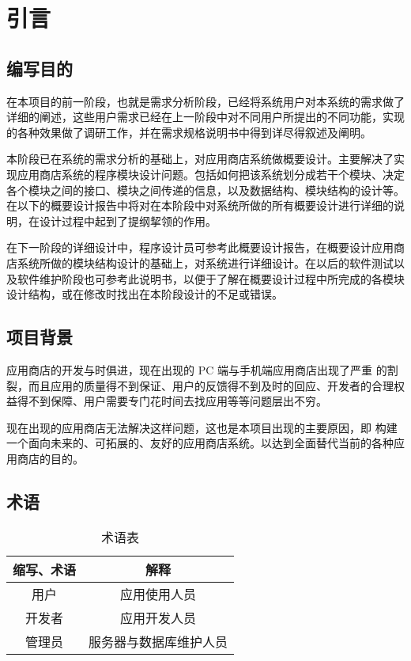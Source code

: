 \chapter{引言}
\section{编写目的}
在本项目的前一阶段，也就是需求分析阶段，已经将系统用户对本系统的需求做了详细的阐述，这些用户需求已经在上一阶段中对不同用户所提出的不同功能，实现的各种效果做了调研工作，并在需求规格说明书中得到详尽得叙述及阐明。

本阶段已在系统的需求分析的基础上，对应用商店系统做概要设计。主要解决了实现应用商店系统的程序模块设计问题。包括如何把该系统划分成若干个模块、决定各个模块之间的接口、模块之间传递的信息，以及数据结构、模块结构的设计等。在以下的概要设计报告中将对在本阶段中对系统所做的所有概要设计进行详细的说明，在设计过程中起到了提纲挈领的作用。

在下一阶段的详细设计中，程序设计员可参考此概要设计报告，在概要设计应用商店系统所做的模块结构设计的基础上，对系统进行详细设计。在以后的软件测试以及软件维护阶段也可参考此说明书，以便于了解在概要设计过程中所完成的各模块设计结构，或在修改时找出在本阶段设计的不足或错误。


\section{项目背景}
应用商店的开发与时俱进，现在出现的 PC 端与手机端应用商店出现了严重
的割裂，而且应用的质量得不到保证、用户的反馈得不到及时的回应、开发者的合理权益得不到保障、用户需要专门花时间去找应用等等问题层出不穷。

现在出现的应用商店无法解决这样问题，这也是本项目出现的主要原因，即
构建一个面向未来的、可拓展的、友好的应用商店系统。以达到全面替代当前的各种应用商店的目的。

\section{术语}
\begin{table}[htbp]
\centering
\caption{术语表} \label{tab:terminology}
\begin{tabular}{|c|c|}
    \hline
    缩写、术语 & 解释 \\
    \hline
    用户 & 应用使用人员 \\
    \hline
    开发者 & 应用开发人员 \\
    \hline
    管理员 & 服务器与数据库维护人员 \\
    \hline
\end{tabular}
\end{table}